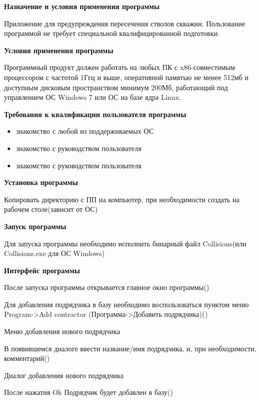 \textbf{Назначение и условия применения программы}

Приложение для предупреждения пересечения стволов скважин.
Пользование программой не требует специальной квалифицированной  подготовки.

\textbf{Условия применения программы}

Программный продукт должен работать на любых ПК с x86-совместимым процессором с частотой 1Ггц и выше,
оперативной памятью не менее 512мб и доступным дисковым пространством минимум 200Мб, работающий под
управлением ОС Windows 7 или ОС на базе ядра Linux.

\textbf{Требования к квалификации пользователя программы}

\begin{itemize}
  \item{знакомство с любой из поддерживаемых ОС}
  \item{знакомство с руководством пользователя}
  \item{знакомство с руководством пользователя}
\end{itemize}

\textbf{Установка программы}

Копировать директорию с ПП на компьютер, при необходимости создать на рабочем столе(зависит от ОС)

\textbf{Запуск программы}

Для запуска программы необходимо исполнить бинарный файл Collisions(или Collisions.exe для ОС Windows)

\textbf{Интерфейс программы}

После запуска программы открывается главное окно программы()


Для добавления подрядчика в базу необходимо воспользоваться пунктом меню Program->Add contractor
(Программа->Добавить подрядчика)()

{Меню добавления нового подрядчика}

В появившемся диалоге ввести название/имя подрядчика, и, при необходимости, комментарий()

{Диалог добавления нового подрядчика}

После нажатия Ok Подрядчик будет добавлен в базу()

